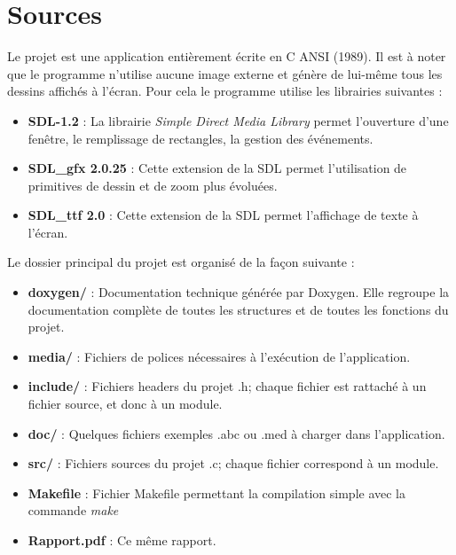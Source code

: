 \documentclass[12pt]{report}
\begin{document}
\section{Sources}
Le projet est une application entièrement écrite en C ANSI (1989). 
Il est à noter que le programme n'utilise aucune image externe et génère de lui-même tous les dessins affichés à l'écran. Pour cela le programme utilise les librairies suivantes :\\
\begin{itemize}
 \item \textbf{SDL-1.2} : La librairie \textit{Simple Direct Media Library} permet l'ouverture d'une fenêtre, le remplissage de rectangles, la gestion des événements.\\
 \item \textbf{SDL\_gfx 2.0.25} : Cette extension de la SDL permet l'utilisation de primitives de dessin et de zoom plus évoluées.\\
 \item \textbf{SDL\_ttf 2.0} : Cette extension de la SDL permet l'affichage de texte à l'écran. \\
\end{itemize}
 Le dossier principal du projet est organisé de la façon suivante :\\
\begin{itemize}
 \item \textbf{doxygen/} : Documentation technique générée par Doxygen. Elle regroupe la documentation complète de toutes les structures et de toutes les fonctions du projet.\\
 \item \textbf{media/} : Fichiers de polices nécessaires à l'exécution de l'application.\\
 \item \textbf{include/} : Fichiers headers du projet .h; chaque fichier est rattaché à un fichier source, et donc à un module.\\
 \item \textbf{doc/} : Quelques fichiers exemples .abc ou .med à charger dans l'application.\\
 \item \textbf{src/} : Fichiers sources du projet .c; chaque fichier correspond à un module. \\
 \item \textbf{Makefile} : Fichier Makefile permettant la compilation simple avec la commande \textit{make}\\
 \item \textbf{Rapport.pdf} : Ce même rapport. \\
\end{itemize}
\end{document}
